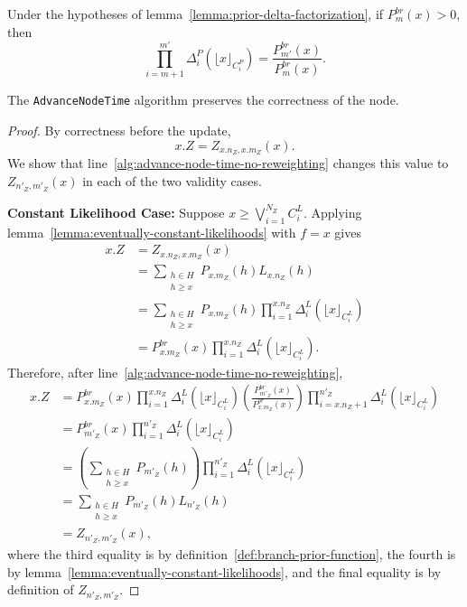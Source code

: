 \begin{corollary}
\label{corollary:prior-delta-quotient}
    Under the hypotheses of lemma~\ref{lemma:prior-delta-factorization}, if
    $P^{br}_{m}(x) > 0$, then
    \[
    \prod_{i=m+1}^{m'} \Delta^P_i(\lfloor x \rfloor_{C^P_i})
    =
    \frac{P^{br}_{m'}(x)}{P^{br}_{m}(x)}.
    \]
\end{corollary}

\begin{theorem}
    The \texttt{AdvanceNodeTime} algorithm preserves the correctness of the node.
\end{theorem}
\begin{proof}
    By correctness before the update,
    $$
    x.Z = Z_{x.n_Z, x.m_Z}(x).
    $$
    We show that line~\ref{alg:advance-node-time-no-reweighting} changes this value to
    $Z_{n'_Z,m'_Z}(x)$ in each of the two validity cases.

    \textbf{Constant Likelihood Case:} Suppose
    $x \geq \bigvee_{i=1}^{N_Z} C^L_i$.
    Applying lemma~\ref{lemma:eventually-constant-likelihoods} with $f=x$ gives
    \begin{align*}
    x.Z
    &= Z_{x.n_Z, x.m_Z}(x) \\
    &= \sum_{\substack{h \in H \\ h \geq x}} P_{x.m_Z}(h) L_{x.n_Z}(h) \\
    &= \sum_{\substack{h \in H \\ h \geq x}} P_{x.m_Z}(h)
    \prod_{i=1}^{x.n_Z} \Delta^L_i(\lfloor x \rfloor_{C^L_i}) \\
    &= P^{br}_{x.m_Z}(x)\prod_{i=1}^{x.n_Z} \Delta^L_i(\lfloor x \rfloor_{C^L_i}).
    \end{align*}
    Therefore, after line~\ref{alg:advance-node-time-no-reweighting},
    \begin{align*}
    x.Z
    &=
    P^{br}_{x.m_Z}(x)\prod_{i=1}^{x.n_Z} \Delta^L_i(\lfloor x \rfloor_{C^L_i})
    \left(\frac{P^{br}_{m'_Z}(x)}{P^{br}_{x.m_Z}(x)}\right)
    \prod_{i=x.n_Z+1}^{n'_Z} \Delta^L_i(\lfloor x \rfloor_{C^L_i}) \\
    &= P^{br}_{m'_Z}(x)\prod_{i=1}^{n'_Z} \Delta^L_i(\lfloor x \rfloor_{C^L_i}) \\
    &= \left(\sum_{\substack{h \in H \\ h \geq x}} P_{m'_Z}(h)\right)
    \prod_{i=1}^{n'_Z} \Delta^L_i(\lfloor x \rfloor_{C^L_i}) \\
    &= \sum_{\substack{h \in H \\ h \geq x}} P_{m'_Z}(h)L_{n'_Z}(h) \\
    &= Z_{n'_Z,m'_Z}(x),
    \end{align*}
    where the third equality is by definition~\ref{def:branch-prior-function},
    the fourth is by lemma~\ref{lemma:eventually-constant-likelihoods},
    and the final equality is by definition of $Z_{n'_Z,m'_Z}$.


\end{proof}
